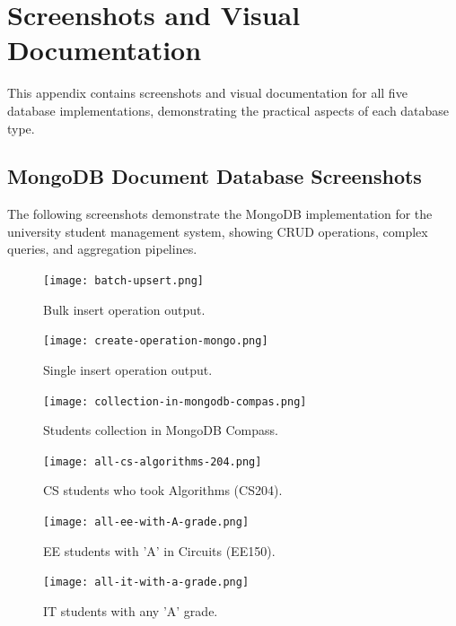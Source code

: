 \chapter{Screenshots and Visual Documentation}

This appendix contains screenshots and visual documentation for all five database implementations, demonstrating the practical aspects of each database type.

\section{MongoDB Document Database Screenshots}

The following screenshots demonstrate the MongoDB implementation for the university student management system, showing CRUD operations, complex queries, and aggregation pipelines.

\begin{figure}[H]
\centering
\texttt{[image: batch-upsert.png]}
\caption{Bulk insert operation output.}
\label{fig:batch-upsert}
\end{figure}

\begin{figure}[H]
\centering
\texttt{[image: create-operation-mongo.png]}
\caption{Single insert operation output.}
\label{fig:create-operation-mongo}
\end{figure}

\begin{figure}[H]
\centering
\texttt{[image: collection-in-mongodb-compas.png]}
\caption{Students collection in MongoDB Compass.}
\label{fig:collection-in-mongodb-compas}
\end{figure}

\begin{figure}[H]
\centering
\texttt{[image: all-cs-algorithms-204.png]}
\caption{CS students who took Algorithms (CS204).}
\label{fig:all-cs-algorithms-204}
\end{figure}

\begin{figure}[H]
\centering
\texttt{[image: all-ee-with-A-grade.png]}
\caption{EE students with 'A' in Circuits (EE150).}
\label{fig:all-ee-with-A-grade}
\end{figure}

\begin{figure}[H]
\centering
\texttt{[image: all-it-with-a-grade.png]}
\caption{IT students with any 'A' grade.}
\label{fig:all-it-with-a-grade}
\end{figure}

